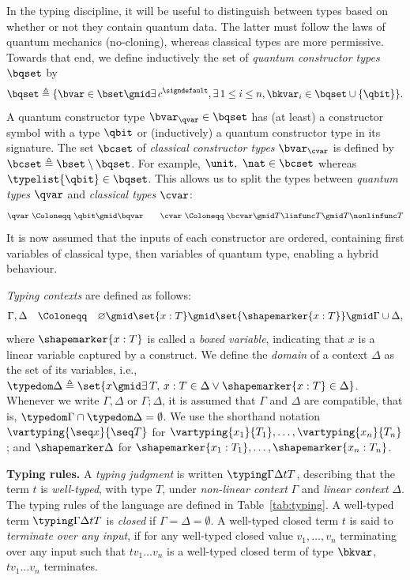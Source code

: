 In the typing discipline, it will be useful to distinguish between
types based on whether or not they contain quantum data. The latter
must follow the laws of quantum mechanics (no-cloning), whereas
classical types are more permissive.
Towards that end, we define inductively the set of \emph{quantum constructor
types} $\bqset$ by 
\[
  \bqset \triangleq \{\bvar \in \bset \gmid
    \exists\,c^{\signdefault}, \exists\,1 \leq
i \leq n, \bkvar_i \in \bqset \cup \{ \qbit\}\}. 
\]
A quantum
constructor type $\bvar_\qvar \in \bqset$ has (at least) a
constructor symbol with a type $\qbit$ or (inductively) a quantum
constructor type in its signature.
The set $\bcset$ of \emph{classical constructor types} $\bvar_\cvar$
is defined by $\bcset \triangleq \bset \setminus \bqset$.
For example, $\unit,\ \nat \in \bcset$ whereas $\typelist{\qbit} \in \bqset$.
This allows us to split the types between \emph{quantum types} $\qvar$ and
\emph{classical types} $\cvar$:
\[
  \qvar \ \Coloneqq \ \qbit \gmid \bqvar
  \qquad
  \cvar \ \Coloneqq \ \bcvar \gmid T \linfunc T \gmid T \nonlinfunc T
\]
It is now assumed that the inputs of each constructor are ordered, containing
first variables of classical type, then variables of quantum type, enabling a
hybrid behaviour.

\emph{Typing contexts} are defined as follows:
\[
  \Gamma, \Delta \quad \Coloneqq \quad \varnothing \gmid \set{x : T}
  \gmid \set{\shapemarker{x : T}} \gmid \Gamma \cup \Delta,
\]
where $\shapemarker{x : T}$ is called a \emph{boxed variable},
indicating that $x$ is a linear variable captured by a \textshape{} construct.
We define the \emph{domain} of a context $\Delta$ as the set of its variables,
i.e., $\typedom \Delta \triangleq \set{x \gmid \exists\,T,\,x : T
\in \Delta \vee \shapemarker{x : T} \in \Delta}$.
Whenever we write $\Gamma, \Delta$ or
$\Gamma;\Delta$, it is assumed that $\Gamma$ and $\Delta$ are compatible, that
is, $\typedom \Gamma \cap \typedom \Delta = \emptyset$.
We use the shorthand notation $\vartyping {\seq x} {\seq T}$ for $\vartyping
{x_1}{T_1}, \dots, \vartyping {x_n}{T_n}$; and $\shapemarker \Delta$ for
$\shapemarker{x_1 : T_1}, \dots, \shapemarker{x_n : T_n}$.

\medskip
\noindent
\textbf{Typing rules. }
A \emph{typing judgment} is written $\typing \Gamma \Delta t T$, describing
that the term $t$ is \emph{well-typed}, with type $T$, under \emph{non-linear
context} $\Gamma$ and \emph{linear context} $\Delta$.
The typing rules of the language are defined in Table~\ref{tab:typing}.
A well-typed term $\typing \Gamma \Delta t T$ is \emph{closed} if $\Gamma =
\Delta = \emptyset$.
A well-typed closed term $t$ is said to \emph{terminate over any input}, if for
any well-typed closed value $v_1, \dots, v_n$ terminating over any input such
that $tv_1\dots v_n$ is a well-typed closed term of type $\bkvar$, $tv_1 \dots
v_n$ terminates.

